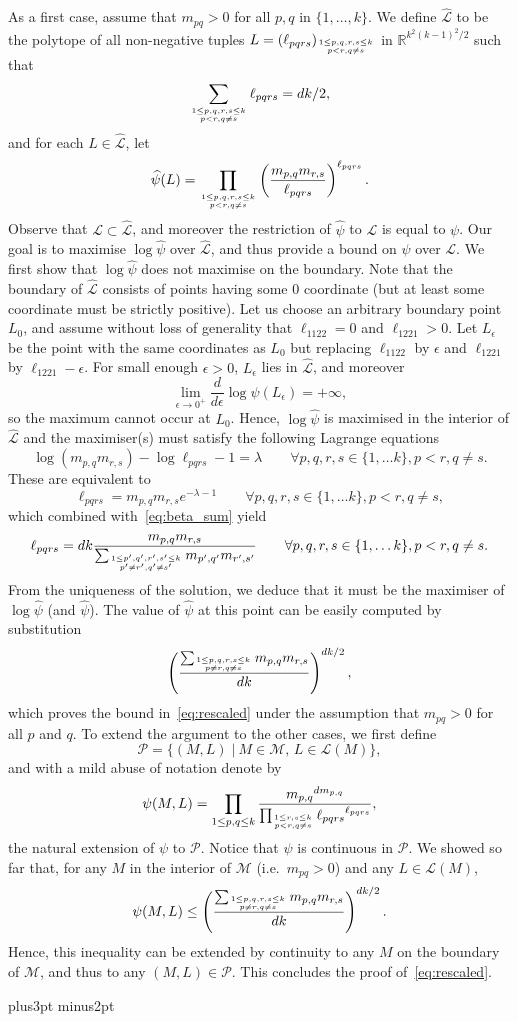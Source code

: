 \documentclass[12pt]{article}
\def\blackslug{\hbox{\kern1pt\vrule height6pt width4pt  depth1pt\kern1pt}}
\def\qed{\penalty 500\hbox{\quad\blackslug}\ifmmode\else\par
                                             \vskip4.5pt plus3pt minus2pt\fi}
\def\st{\; | \:}
\newcommand{\real}{\ensuremath {\mathbb R} }
\newcommand{\cL} {\ensuremath{\mathcal L}}
\newcommand{\cM} {\ensuremath{\mathcal M}}
\newcommand{\cP} {\ensuremath{\mathcal P}}
\newcommand{\hcL} {\ensuremath{\widehat{\mathcal L}}}
\begin{document}
As a first case, assume that $m_{pq}>0$ for all $p,q$ in $\{1,\ldots,k\}$.
We define $\hcL$ to be the polytope of all non-negative tuples $L=(\ell_{pqrs})_{1\le p,q,r,s\le k\atop p<r,q\ne s}$ in $\real^{k^2(k-1)^2/2}$ such that
%
\begin{equation}\label{eq:beta_sum}
\sum_{1\le p,q,r,s\le k\atop p<r,q\ne s} \ell_{pqrs} = dk/2,
\end{equation}
%
and for each $L\in\hcL$, let
\[
\widehat\psi(L) = \prod_{1\le p,q,r,s\le k\atop p<r,q\ne s} \left(\frac{m_{p,q}m_{r,s}}{{\ell_{pqrs}}}\right)^{\ell_{pqrs}}.
\]
Observe that $\cL\subset\hcL$, and moreover the restriction of $\widehat\psi$ to $\cL$ is equal to $\psi$.
Our goal is to maximise $\log\widehat\psi$ over $\hcL$, and thus provide a bound on $\psi$ over $\cL$. We first show that $\log\widehat\psi$ does not maximise on the boundary. Note that the boundary of $\hcL$ consists of points having some $0$ coordinate (but at least some coordinate must be strictly positive). Let us choose an arbitrary boundary point $L_0$, and assume without loss of generality that $\ell_{1122}=0$ and $\ell_{1221}>0$. Let $L_\epsilon$ be the point with the same coordinates as $L_0$ but replacing $\ell_{1122}$ by $\epsilon$ and $\ell_{1221}$ by $\ell_{1221}-\epsilon$. For small enough $\epsilon>0$, $L_\epsilon$ lies in $\hcL$, and moreover
\[
\lim_{\epsilon\to0^+}\frac{d}{d\epsilon}\log\widehat\psi(L_\epsilon)=+\infty,
\]
so the maximum cannot occur at $L_0$. Hence, $\log\widehat\psi$ is maximised in the interior of $\hcL$ and the maximiser(s) must satisfy the following Lagrange equations
\[
\log(m_{p,q}m_{r,s}) - \log\ell_{pqrs} - 1 = \lambda \qquad \forall 
p,q,r,s\in\{1,\ldots k\}, p<r, q\ne s.
\]
These are equivalent to
\[
\ell_{pqrs} = m_{p,q}m_{r,s} e^{-\lambda-1} \qquad \forall p,q,r,s\in\{1,\ldots k\}, p<r, q\ne s,
\]
which combined with~\eqref{eq:beta_sum} yield
\[
\ell_{pqrs} = dk \frac{m_{p,q}m_{r,s}}{\sum_{1\le p',q',r',s'\le k\atop p'\ne r',q'\ne s'} m_{p',q'}m_{r',s'}} \qquad \forall p,q,r,s\in\{1,\ldots k\}, p<r, q\ne s.
\]
{From} the uniqueness of the solution, we deduce that it must be the maximiser of $\log\widehat\psi$ (and $\widehat\psi$). The value of $\widehat\psi$ at this point can be easily computed by substitution
\[
\left(\frac{\sum_{1\le p,q,r,s\le k\atop p\ne r,q\ne s} m_{p,q}m_{r,s}}{dk}\right)^{dk/2},
\]
which proves the bound in~\eqref{eq:rescaled} under the assumption that $m_{pq}>0$ for all $p$ and $q$. To extend the argument to the other cases, we first define
\[
\cP = \{ (M,L)\st M\in\cM,\, L\in\cL(M) \},
\]
and with a mild abuse of notation denote by
\[
\psi(M,L) = \prod_{1\le p,q\le k} \frac{{m_{p,q}}^{dm_{p,q}}}{\prod_{1\le r,s\le k\atop p<r,q\ne s} {\ell_{pqrs}}^{\ell_{pqrs}}},
\]
the natural extension of $\psi$ to $\cP$. Notice that $\psi$ is continuous in $\cP$. We showed so far that, for any $M$ in the interior of $\cM$ (i.e.~$m_{pq}>0$) and any $L\in\cL(M)$,
\[
\psi(M,L) \le \left(\frac{\sum_{1\le p,q,r,s\le k\atop p\ne r,q\ne s} m_{p,q}m_{r,s}}{dk}\right)^{dk/2}.
\]
Hence, this inequality can be extended by continuity to any $M$ on the boundary of $\cM$, and thus to any $(M,L)\in\cP$. This concludes the proof of~\eqref{eq:rescaled}.
\qed
\end{document}
